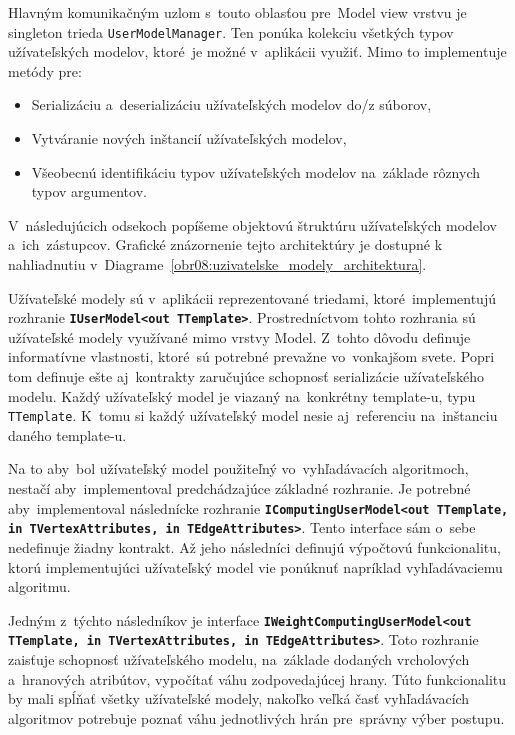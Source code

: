 Hlavným komunikačným uzlom s~touto oblasťou pre~Model view vrstvu je singleton trieda \texttt{UserModelManager}. Ten ponúka kolekciu všetkých typov užívateľských modelov, ktoré~je možné v~aplikácii využiť. Mimo to implementuje metódy pre:
\begin{itemize}
    \item Serializáciu a~deserializáciu užívateľských modelov do/z súborov,
    \item Vytváranie nových inštancií užívateľských modelov,
    \item Všeobecnú identifikáciu typov užívateľských modelov na~základe rôznych typov argumentov.
\end{itemize}

V~následujúcich odsekoch popíšeme objektovú štruktúru užívateľských modelov a~ich~zástupcov. Grafické znázornenie tejto architektúry je dostupné k nahliadnutiu v~Diagrame~\ref{obr08:uzivatelske_modely_architektura}.   

\bigskip

Užívateľské modely sú v~aplikácii reprezentované triedami, ktoré~implementujú rozhranie \textbf{\texttt{IUserModel<out TTemplate>}}.  Prostredníctvom tohto rozhrania sú užívateľské modely využívané mimo vrstvy Model. Z~tohto dôvodu definuje informatívne vlastnosti, ktoré~sú potrebné prevažne vo~vonkajšom svete. Popri tom definuje ešte aj~kontrakty zaručujúce schopnosť serializácie užívateľského modelu. Každý užívateľský model je viazaný na~konkrétny template-u, typu \texttt{TTemplate}. K~tomu si každý užívateľský model nesie aj~referenciu na~inštanciu daného template-u.

Na to aby~bol užívateľský model použiteľný vo~vyhľadávacích algoritmoch, nestačí aby~implementoval predchádzajúce základné rozhranie. Je potrebné aby~implementoval následnícke rozhranie \textbf{\texttt{IComputingUserModel<out TTemplate, in TVertexAttributes, in TEdgeAttributes>}}. Tento interface sám o~sebe nedefinuje žiadny kontrakt. Až jeho následníci definujú výpočtovú funkcionalitu, ktorú implementujúci užívateľský model vie ponúknuť napríklad vyhľadávaciemu algoritmu. 

Jedným z~týchto následníkov je interface \textbf{\texttt{IWeightComputingUserModel<out TTemplate, in TVertexAttributes, in TEdgeAttributes>}}. Toto rozhranie zaisťuje schopnosť užívateľského modelu, na~základe dodaných vrcholových a~hranových atribútov, vypočítať váhu zodpovedajúcej hrany. Túto funkcionalitu by mali spĺňať všetky užívateľské modely, nakoľko veľká časť vyhľadávacích algoritmov potrebuje poznať váhu jednotlivých hrán pre~správny výber postupu.

